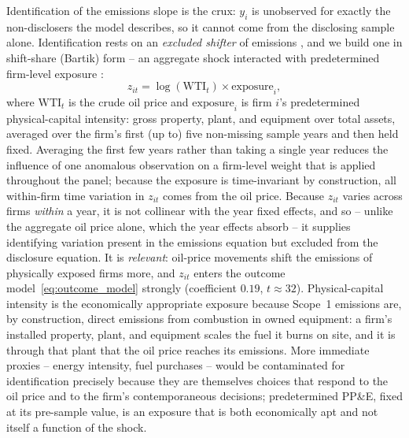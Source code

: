 \documentclass[a4paper,12pt]{article}
\newcommand{\citep}[1]{\parencite{#1}}
\begin{document}
Identification of the emissions slope is the crux: $y_i$ is unobserved for exactly the non-disclosers the model describes, so it cannot come from the disclosing sample alone. Identification rests on an \emph{excluded shifter} of emissions \citep{wang2014instrumental}, and we build one in shift-share (Bartik) form -- an aggregate shock interacted with predetermined firm-level exposure \citep{goldsmithpinkham2020bartik, borusyak2022quasi}:
\begin{equation}
\label{eq:instrument}
z_{it} = \log(\mathrm{WTI}_t) \times \mathrm{exposure}_i ,
\end{equation}
where $\mathrm{WTI}_t$ is the crude oil price and $\mathrm{exposure}_i$ is firm $i$'s predetermined physical-capital intensity: gross property, plant, and equipment over total assets, averaged over the firm's first (up to) five non-missing sample years and then held fixed. Averaging the first few years rather than taking a single year reduces the influence of one anomalous observation on a firm-level weight that is applied throughout the panel; because the exposure is time-invariant by construction, all within-firm time variation in $z_{it}$ comes from the oil price. Because $z_{it}$ varies across firms \emph{within} a year, it is not collinear with the year fixed effects, and so -- unlike the aggregate oil price alone, which the year effects absorb -- it supplies identifying variation present in the emissions equation but excluded from the disclosure equation. It is \emph{relevant}: oil-price movements shift the emissions of physically exposed firms more, and $z_{it}$ enters the outcome model~\eqref{eq:outcome_model} strongly (coefficient $0.19$, $t \approx 32$). Physical-capital intensity is the economically appropriate exposure because Scope~1 emissions are, by construction, direct emissions from combustion in owned equipment: a firm's installed property, plant, and equipment scales the fuel it burns on site, and it is through that plant that the oil price reaches its emissions. More immediate proxies -- energy intensity, fuel purchases -- would be contaminated for identification precisely because they are themselves choices that respond to the oil price and to the firm's contemporaneous decisions; predetermined PP\&E, fixed at its pre-sample value, is an exposure that is both economically apt and not itself a function of the shock.
\end{document}
